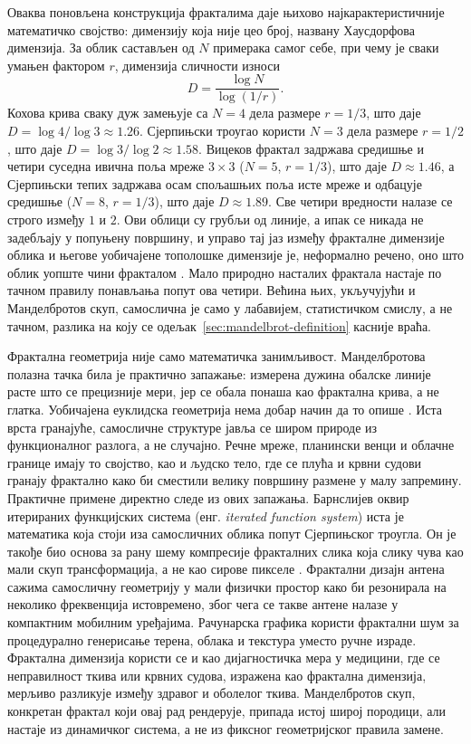 \documentclass[serbian]{ftndiplomski}
\begin{document}
Оваква поновљена конструкција фракталима даје њихово најкарактеристичније математичко
својство: димензију која није цео број, названу Хаусдорфова димензија. За облик састављен од $N$ примерака самог
себе, при чему је сваки умањен фактором $r$, димензија сличности износи
\begin{equation}
  \label{eq:similarity-dimension}
  D = \frac{\log N}{\log(1/r)}.
\end{equation}
Кохова крива сваку дуж замењује са $N=4$ дела размере $r=1/3$, што даје $D = \log 4 /
\log 3 \approx 1.26$. Сјерпињски троугао користи $N=3$ дела размере $r=1/2$, што даје
$D = \log 3 / \log 2 \approx 1.58$. Вицеков фрактал задржава средишње и четири суседна
ивична поља мреже $3\times3$ ($N=5$, $r=1/3$), што даје $D \approx 1.46$, а Сјерпињски
тепих задржава осам спољашњих поља исте мреже и одбацује средишње ($N=8$, $r=1/3$), што
даје $D \approx 1.89$. Све четири вредности налазе се строго између $1$ и $2$. Ови
облици су грубљи од линије, а ипак се никада не задебљају у попуњену површину, и управо
тај јаз између фракталне димензије облика и његове уобичајене тополошке димензије је,
неформално речено, оно што облик уопште чини фракталом \cite{falconer2014}. Мало
природно насталих фрактала настаје по тачном правилу понављања попут ова четири.
Већина њих, укључујући и Манделбротов скуп, самослична је само у лабавијем,
статистичком смислу, а не тачном, разлика на коју се одељак~\ref{sec:mandelbrot-definition}
касније враћа.

Фрактална геометрија није само математичка занимљивост. Манделбротова полазна тачка
била је практично запажање: измерена дужина обалске линије расте што се прецизније
мери, јер се обала понаша као фрактална крива, а не глатка. Уобичајена еуклидска
геометрија нема добар начин да то опише \cite{mandelbrot1982}. Иста врста гранајуће,
самосличне структуре јавља се широм природе из функционалног разлога, а не случајно.
Речне мреже, планински венци и облачне границе имају то својство, као и људско тело,
где се плућа и крвни судови гранају фрактално како би сместили велику површину размене
у малу запремину. Практичне примене директно следе из ових запажања. Барнслијев оквир
итерираних функцијских система (енг. \emph{iterated function system}) иста је математика
која стоји иза самосличних облика попут Сјерпињског троугла. Он је такође био основа за
рану шему компресије фракталних слика која слику чува као мали скуп трансформација, а
не као сирове пикселе \cite{barnsley1988}. Фрактални дизајн антена сажима самосличну
геометрију у мали физички простор како би резонирала на неколико фреквенција
истовремено, због чега се такве антене налазе у компактним мобилним уређајима.
Рачунарска графика користи фрактални шум за процедурално генерисање терена, облака и
текстура уместо ручне израде. Фрактална димензија користи се и као дијагностичка мера у
медицини, где се неправилност ткива или крвних судова, изражена као фрактална
димензија, мерљиво разликује између здравог и оболелог ткива. Манделбротов скуп,
конкретан фрактал који овај рад рендерује, припада истој широј породици, али настаје из
динамичког система, а не из фиксног геометријског правила замене.
\end{document}
